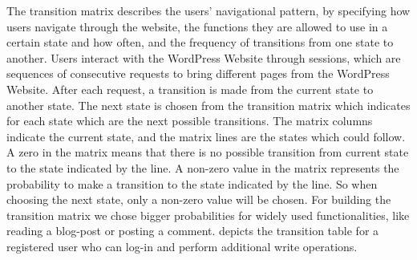 The transition matrix describes the users' navigational pattern, by specifying how users navigate through the website, the functions they are allowed to use in a certain state and how often, and the frequency of transitions from one state to another. Users interact with the WordPress Website through sessions, which are sequences of consecutive requests to bring different pages from the WordPress Website. After each request, a transition is made from the current state to another state. The next state is chosen from the transition matrix which indicates for each state which are the next possible transitions. The matrix columns indicate the current state, and the matrix lines are the states which could follow. A zero in the matrix means that there is no possible transition from current state to the state indicated by the line. A non-zero value in the matrix represents the probability to make a transition to the state indicated by the line. So when choosing the next state, only a non-zero value will be chosen. For building the transition matrix we chose bigger probabilities for widely used functionalities, like reading a blog-post or posting a comment.  depicts the transition table for a registered user who can log-in and perform additional write operations.


